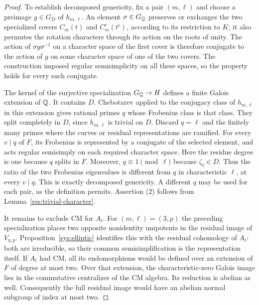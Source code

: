 \begin{proof}
To establish decomposed genericity, fix a pair $(m,\ell)$ and
choose a preimage $g\in G_D$ of $h_{m,\ell}$.
An element $\sigma\in G_\mathbb Q$ preserves or
exchanges the two specialized covers $C_m(t)$ and $C_m^c(t^c)$,
according to its restriction to $K$; it also permutes the rotation
characters through its action on the roots of unity.  The action
of $\sigma g\sigma^{-1}$ on a character space of the first cover
is therefore conjugate to the action of $g$ on some character
space of one of the two covers.
The construction imposed regular semisimplicity on all these
spaces, so the property holds for every such conjugate.

The kernel of the surjective specialization $G_\mathbb Q\to H$ defines
a finite Galois extension of $\mathbb Q$.  It contains $D$.
Chebotarev applied to the conjugacy class of $h_{m,\ell}$ in
this extension gives rational primes $q$ whose Frobenius class
is that class.  They split completely in $D$, since
$h_{m,\ell}$ is trivial on $D$.  Discard $q=\ell$ and the finitely
many primes where the curves or residual representations are
ramified.  For every $v\mid q$ of $F$, its Frobenius is represented
by a conjugate of the selected element, and acts regular
semisimply on each required character space.  Here the residue
degree is one because $q$ splits in $F$.  Moreover,
$q\equiv1\pmod\ell$ because $\zeta_\ell\in D$.
Thus the ratio of the two Frobenius eigenvalues is different from
$q$ in characteristic $\ell$, at every $v\mid q$.  This is
exactly decomposed genericity.  A different $q$ may be used for
each pair, as the definition permits.  Assertion (2) follows
from Lemma~\ref{res:trivial-character}.

It remains to exclude CM for $A_t$.  For $(m,\ell)=(3,p)$ the
preceding specialization places two opposite nonidentity
unipotents in the residual image of $V_{\eta,p}$.
Proposition~\ref{sys:elliptic} identifies this with the residual
cohomology of $A_t$: both are irreducible, so their common
semisimplification is the representation itself.
If $A_t$ had CM, all its endomorphisms would be defined over an
extension of $F$ of degree at most two.  Over that extension,
the characteristic-zero Galois image lies in the commutative
centralizer of the CM algebra.  Its reduction is abelian as well.
Consequently the full residual image would have an abelian
normal subgroup of index at most two.


\end{proof}
